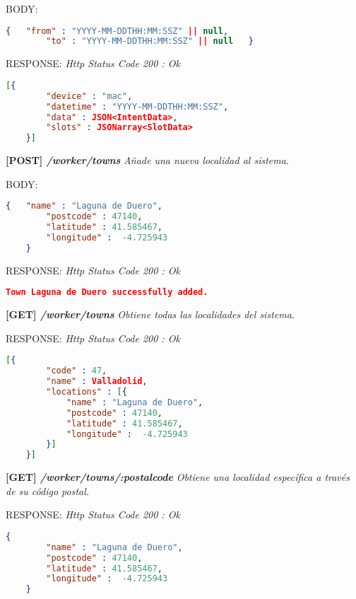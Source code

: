     BODY:
   \begin{lstlisting}[language=json,firstnumber=1]
    {   "from" : "YYYY-MM-DDTHH:MM:SSZ" || null,
        "to" : "YYYY-MM-DDTHH:MM:SSZ" || null   }
    \end{lstlisting} 
    
    RESPONSE: \newline
    \textit{Http Status Code 200 : Ok}
    \begin{lstlisting}[language=json,firstnumber=1]
    [{
        "device" : "mac",
        "datetime" : "YYYY-MM-DDTHH:MM:SSZ",
        "data" : JSON<IntentData>,
        "slots" : JSONarray<SlotData>
    }]
    \end{lstlisting}
\hline \newline

\textbf{[POST] \textit{/worker/towns }}
\textit{Añade una nueva localidad al sistema.}

    BODY:
   \begin{lstlisting}[language=json,firstnumber=1]
    {   "name" : "Laguna de Duero",
        "postcode" : 47140,
        "latitude" : 41.585467,
        "longitude" :  -4.725943
    }
    \end{lstlisting} 
    
    RESPONSE: \newline
    \textit{Http Status Code 200 : Ok}
    \begin{lstlisting}[language=json,firstnumber=1]
    Town Laguna de Duero successfully added.
    \end{lstlisting}
\hline \newline

\textbf{[GET] \textit{/worker/towns }}
\textit{Obtiene todas las localidades del sistema.}
    
    RESPONSE: \newline
    \textit{Http Status Code 200 : Ok}
    \begin{lstlisting}[language=json,firstnumber=1]
    [{
        "code" : 47,
        "name" : Valladolid,
        "locations" : [{
            "name" : "Laguna de Duero",
            "postcode" : 47140,
            "latitude" : 41.585467,
            "longitude" :  -4.725943
        }]
    }]
    \end{lstlisting}
\hline

\textbf{[GET] \textit{/worker/towns/:postalcode }}
\textit{Obtiene una localidad específica a través de su código postal.}
    
    RESPONSE: \newline
    \textit{Http Status Code 200 : Ok}
    \begin{lstlisting}[language=json,firstnumber=1]
    {
        "name" : "Laguna de Duero",
        "postcode" : 47140,
        "latitude" : 41.585467,
        "longitude" :  -4.725943
    }
    \end{lstlisting}
\hline

